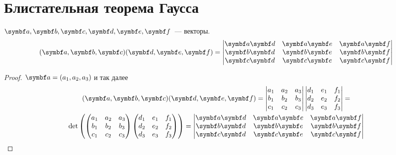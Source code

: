 \documentclass[main]{subfiles}
\begin{document}
\section{Блистательная теорема Гаусса}
\begin{lemma}\label{touching_paraboloid:cross_product_lemma}
    $\va, \vb, \vc, \vd, \ve, \vf$~--- векторы.
    \[(\va, \vb, \vc)(\vd, \ve,\vf) = \begin{vmatrix}
            \va\vd & \va\ve & \va\vf \\
            \vb\vd & \vb\ve & \vb\vf \\
            \vc\vd & \vc\ve & \vc\vf
        \end{vmatrix}\]
\end{lemma}
\begin{proof}
    $\va = (a_1, a_2, a_3)$ и так далее
    \begin{multline*}
        (\va, \vb, \vc)(\vd, \ve, \vf) = \begin{vmatrix}
            a_1 & a_2 & a_3 \\
            b_1 & b_2 & b_3 \\
            c_1 & c_2 & c_3
        \end{vmatrix}
        \begin{vmatrix}
            d_1 & e_1 & f_1 \\
            d_2 & e_2 & f_2 \\
            d_3 & e_3 & f_3
        \end{vmatrix}
        = \\
        \det \left( \begin{pmatrix}
            a_1 & a_2 & a_3 \\
            b_1 & b_2 & b_3 \\
            c_1 & c_2 & c_3
        \end{pmatrix}
        \begin{pmatrix}
            d_1 & e_1 & f_1 \\
            d_2 & e_2 & f_2 \\
            d_3 & e_3 & f_3
        \end{pmatrix}\right) =
        \begin{vmatrix}
            \va\vd & \va\ve & \va\vf \\
            \vb\vd & \vb\ve & \vb\vf \\
            \vc\vd & \vc\ve & \vc\vf
        \end{vmatrix}
    \end{multline*}
\end{proof}
\end{document}
